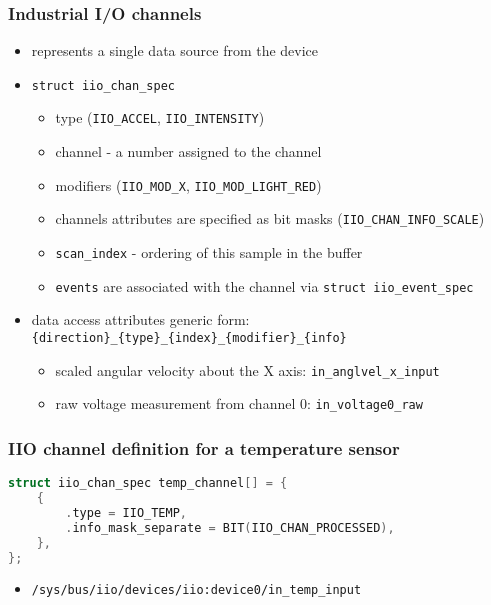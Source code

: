 \documentclass[aspectratio=169]{beamer}
\begin{document}
\begin{frame}
\frametitle{Industrial I/O channels}
\begin{itemize}
    \item represents a single data source from the device
    \item \texttt{struct iio\_chan\_spec}
    \begin{itemize}
        \item type (\texttt{IIO\_ACCEL}, \texttt{IIO\_INTENSITY})
        \item channel - a number assigned to the channel
        \item modifiers (\texttt{IIO\_MOD\_X}, \texttt{IIO\_MOD\_LIGHT\_RED})
        \item channels attributes are specified as bit masks (\texttt{IIO\_CHAN\_INFO\_SCALE})
        \item \texttt{scan\_index} - ordering of this sample in the buffer
        \item \texttt{events} are associated with the channel via \texttt{struct iio\_event\_spec}
    \end{itemize}
    \item data access attributes generic form: \texttt{\{direction\}\_\{type\}\_\{index\}\_\{modifier\}\_\{info\}}\begin{itemize}
        \item scaled angular velocity about the X axis: \texttt{in\_anglvel\_x\_input}
        \item raw voltage measurement from channel 0: \texttt{in\_voltage0\_raw}
    \end{itemize}
\end{itemize}
\end{frame}


\begin{frame}[fragile]
\frametitle{IIO channel definition for a temperature sensor}
\begin{lstlisting}[language=C]
struct iio_chan_spec temp_channel[] = {
    {
        .type = IIO_TEMP,
        .info_mask_separate = BIT(IIO_CHAN_PROCESSED),
    },
};
\end{lstlisting}
\begin{itemize}
    \item \texttt{/sys/bus/iio/devices/iio:device0/in\_temp\_input}
\end{itemize}
\end{frame}
\end{document}
